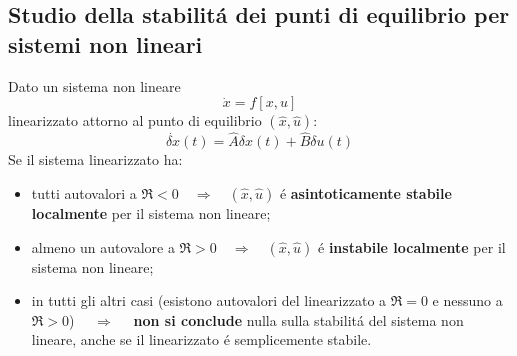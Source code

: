 \documentclass[../main.tex]{subfiles}
\begin{document}
	\subsection{Studio della stabilit\'a dei punti di equilibrio per sistemi non lineari}
		Dato un sistema non lineare
		\[
			\dot x = f\left[ x,u \right]
		\]
		linearizzato attorno al punto di equilibrio $ (\hat x, \hat u) $:
		\[
			\dot{\delta x}(t) = \hat A \delta x(t) + \hat B \delta u(t)
		\]
		Se il sistema linearizzato ha:
		\begin{itemize}
			\item
				tutti autovalori a $ \Re < 0 \quad \Rightarrow \quad (\hat x, \hat u) $ \'e \textbf{asintoticamente stabile localmente} per il sistema non lineare;
			\item
				almeno un autovalore a $ \Re > 0 \quad \Rightarrow \quad (\hat x, \hat u) $ \'e \textbf{instabile localmente} per il sistema non lineare;
			\item
				in tutti gli altri casi (esistono autovalori del linearizzato a $ \Re = 0 $ e nessuno a $ \Re > 0 $) $ \quad \Rightarrow \quad $ \textbf{non si conclude} nulla sulla stabilit\'a del sistema non lineare, anche se il linearizzato \'e semplicemente stabile.
		\end{itemize}
	
\end{document}
